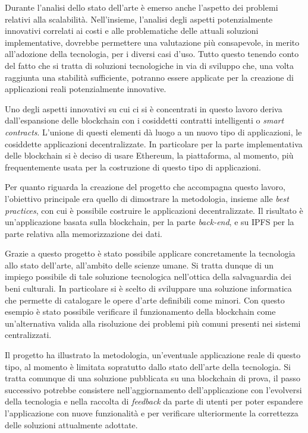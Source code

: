 Durante l’analisi dello stato dell’arte è emerso anche l’aspetto dei problemi relativi alla scalabilità. Nell'insieme, l'analisi degli aspetti potenzialmente innovativi correlati ai costi e alle problematiche delle attuali soluzioni implementative, dovrebbe permettere una valutazione più consapevole, in merito all'adozione della tecnologia, per i diversi casi d'uso. Tutto questo tenendo conto del fatto che si tratta di soluzioni tecnologiche in via di sviluppo che, una volta raggiunta una stabilità sufficiente, potranno essere applicate per la creazione di applicazioni reali potenzialmente innovative. 

Uno degli aspetti innovativi su cui ci si è concentrati in questo lavoro deriva dall'espansione delle blockchain con i cosiddetti contratti intelligenti o \emph{smart contracts}. L'unione di questi elementi dà luogo a un nuovo tipo di applicazioni, le cosiddette applicazioni decentralizzate. In particolare per la parte implementativa delle blockchain si è deciso di usare Ethereum, la piattaforma, al momento, più frequentemente usata per la costruzione di questo tipo di applicazioni.

Per quanto riguarda la creazione del progetto che accompagna questo lavoro, l’obiettivo principale era quello di dimostrare la metodologia, insieme alle \emph{best practices}, con cui è possibile costruire le applicazioni decentralizzate. Il risultato è un'applicazione basata sulla blockchain, per la parte \emph{back-end}, e su IPFS per la parte relativa alla memorizzazione dei dati. 

Grazie a questo progetto è stato possibile applicare concretamente la tecnologia allo stato dell'arte, all'ambito delle scienze umane. Si tratta dunque di un impiego possibile di tale soluzione tecnologica nell'ottica della salvaguardia dei beni culturali. In particolare si è scelto di sviluppare una soluzione informatica che permette di catalogare le opere d'arte definibili come minori. Con questo esempio è stato possibile verificare il funzionamento della blockchain come un’alternativa valida alla risoluzione dei problemi più comuni presenti nei sistemi centralizzati. 

Il progetto ha illustrato la metodologia, un'eventuale applicazione reale di questo tipo, al momento è limitata sopratutto dallo stato dell'arte della tecnologia. Si tratta comunque di una soluzione pubblicata su una blockchain di prova, il passo successivo potrebbe consistere nell'aggiornamento dell'applicazione con l'evolversi della tecnologia e nella raccolta di \emph{feedback} da parte di utenti per poter espandere l'applicazione con nuove funzionalità e per verificare ulteriormente la correttezza delle soluzioni attualmente adottate.

